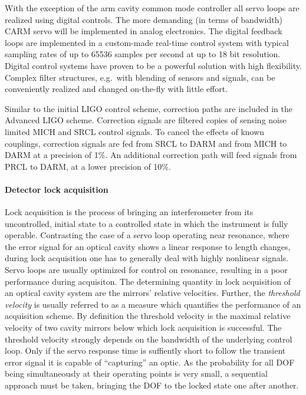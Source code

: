 With the exception of the arm cavity common mode controller all servo loops are realized using digital controls.
The more demanding (in terms of bandwidth) CARM servo will be implemented in analog electronics.
The digital feedback loops are implemented in a custom-made real-time control system with typical sampling rates of up to
65536 samples per second at up to 18 bit resolution. Digital control systems have proven to be a powerful solution with high flexibility. 
Complex filter structures, e.g.\ with blending of sensors and signals, can be conveniently realized and changed on-the-fly with little effort.

Similar to the initial LIGO control scheme, correction paths are included in the Advanced LIGO scheme. Correction signals are filtered 
copies of sensing noise limited MICH and SRCL control signals. To cancel the effects of known couplings, correction signals are fed
from SRCL to DARM and from MICH to DARM at a precision of 1\%. An additional correction path will feed signals from PRCL to DARM, at
a lower precision of 10\%.
\FloatBarrier
\paragraph{Detector lock acquisition}\label{sec:detector_lock_acquisition}
Lock acquisition is the process of bringing an interferometer from its uncontrolled, initial state to a controlled state in which the instrument
is fully operable. 
Contrasting the case of a servo loop operating near resonance, where the error signal for an optical cavity shows a linear response to length changes, during lock acquisition one has
to generally deal with highly nonlinear signals. Servo loops are usually optimized for control on resonance, resulting in a poor performance during acquisiton.
The determining quantity in lock acquisition of an optical cavity system are the mirrors' relative velocities. Further, the \emph{threshold velocity} 
is usually referred to as a measure which quantifies the performance of an acquisition scheme. By definition the threshold velocity is the maximal relative velocity of 
two cavity mirrors below which lock acquisition is successful. The threshold velocity strongly depends on the bandwidth of the underlying control loop.
Only if the servo response time is suffiently short to follow the transient error signal it is capable of ``capturing'' an optic.
As the probability for all DOF being simultaneously at their operating points is very small, a sequential approach must be taken, bringing the DOF to the locked state one after another.

